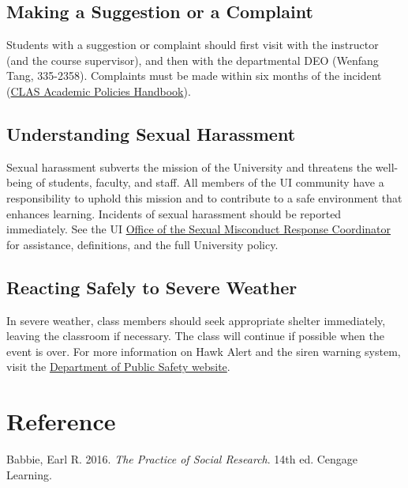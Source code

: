 \documentclass[11pt,]{article}
\theoremstyle{definition}
\theoremstyle{definition}
\theoremstyle{definition}
\theoremstyle{remark}
\begin{document}
\subsection{Making a Suggestion or a
Complaint}\label{making-a-suggestion-or-a-complaint}

Students with a suggestion or complaint should first visit with the
instructor (and the course supervisor), and then with the departmental
DEO (Wenfang Tang, 335-2358). Complaints must be made within six months
of the incident (\href{https://clas.uiowa.edu/students/handbook}{CLAS
Academic Policies Handbook}).

\subsection{Understanding Sexual
Harassment}\label{understanding-sexual-harassment}

Sexual harassment subverts the mission of the University and threatens
the well-being of students, faculty, and staff. All members of the UI
community have a responsibility to uphold this mission and to contribute
to a safe environment that enhances learning. Incidents of sexual
harassment should be reported immediately. See the UI
\href{https://osmrc.uiowa.edu/}{Office of the Sexual Misconduct Response
Coordinator} for assistance, definitions, and the full University
policy.

\subsection{Reacting Safely to Severe
Weather}\label{reacting-safely-to-severe-weather}

In severe weather, class members should seek appropriate shelter
immediately, leaving the classroom if necessary. The class will continue
if possible when the event is over. For more information on Hawk Alert
and the siren warning system, visit the
\href{https://police.uiowa.edu/emergency-communications}{Department of
Public Safety website}.

\clearpage

\section*{Reference}\label{reference}

\hypertarget{refs}{}
\hypertarget{ref-Babbie2016}{}
Babbie, Earl R. 2016. \emph{The Practice of Social Research}. 14th ed.
Cengage Learning.



\clearpage
\end{document}
